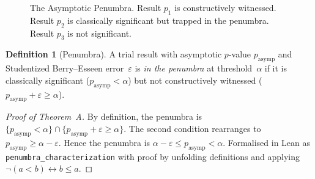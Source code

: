 \documentclass[11pt,a4paper]{article}
\theoremstyle{plain}
\theoremstyle{definition}
\newtheorem{definition}[theorem]{Definition}
\newcommand{\BISH}{\textsf{BISH}}
\newcommand{\MP}{\textsf{MP}}
\begin{document}
\begin{figure}[ht]
\centering
{}
\caption{The Asymptotic Penumbra.  Result $p_1$ is constructively witnessed.  Result $p_2$ is classically significant but trapped in the penumbra.  Result $p_3$ is not significant.}
\label{fig:penumbra-band}
\end{figure}

\begin{definition}[Penumbra]\label{def:penumbra}
A trial result with asymptotic $p$-value $p_{\mathrm{asymp}}$ and Studentized Berry--Esseen error~$\varepsilon$ is \emph{in the penumbra} at threshold~$\alpha$ if it is classically significant ($p_{\mathrm{asymp}} < \alpha$) but not constructively witnessed ($p_{\mathrm{asymp}} + \varepsilon \geq \alpha$).
\end{definition}

\begin{proof}[Proof of Theorem~A]
By definition, the penumbra is $\{p_{\mathrm{asymp}} < \alpha\} \cap \{p_{\mathrm{asymp}} + \varepsilon \geq \alpha\}$.  The second condition rearranges to $p_{\mathrm{asymp}} \geq \alpha - \varepsilon$.  Hence the penumbra is $\alpha - \varepsilon \leq p_{\mathrm{asymp}} < \alpha$.  Formalised in Lean as \texttt{penumbra\_characterization} with proof by unfolding definitions and applying $\lnot(a < b) \leftrightarrow b \leq a$.
\end{proof}
\end{document}
